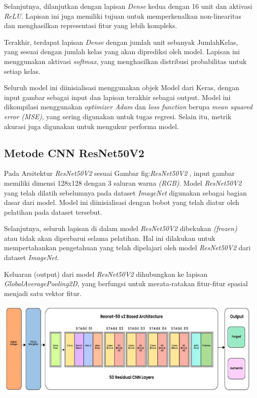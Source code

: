 Selanjutnya, dilanjutkan dengan lapisan \textit{Dense} kedua dengan 16 unit dan aktivasi \textit{ReLU}. Lapisan ini juga memiliki tujuan untuk memperkenalkan non-linearitas dan menghasilkan representasi fitur yang lebih kompleks.

Terakhir, terdapat lapisan \textit{Dense} dengan jumlah unit sebanyak JumlahKelas, yang sesuai dengan jumlah kelas yang akan diprediksi oleh model. Lapisan ini menggunakan aktivasi \textit{softmax}, yang menghasilkan distribusi probabilitas untuk setiap kelas.

Seluruh model ini diinisialisasi menggunakan objek Model dari Keras, dengan input gambar sebagai input dan lapisan terakhir sebagai output. Model ini dikompilasi menggunakan \textit{optimizer Adam} dan \textit{loss function} berupa\textit{ mean squared error (MSE)}, yang sering digunakan untuk tugas regresi. Selain itu, metrik akurasi juga digunakan untuk mengukur performa model.

\subsection{Metode CNN ResNet50V2}

Pada Arsitektur \textit{ResNet50V2} sesuai Gambar {fig:\textit{ResNet50V2}} , input gambar memiliki dimensi 128x128 dengan 3 saluran warna \textit{(RGB)}. Model \textit{ResNet50V2} yang telah dilatih sebelumnya pada dataset \textit{ImageNet} digunakan sebagai bagian dasar dari model. Model ini diinisialisasi dengan bobot yang telah diatur oleh pelatihan pada dataset tersebut.

Selanjutnya, seluruh lapisan di dalam model \textit{ResNet50V2} dibekukan \textit{(frozen)} atau tidak akan diperbarui selama pelatihan. Hal ini dilakukan untuk mempertahankan pengetahuan yang telah dipelajari oleh model \textit{ResNet50V2} dari dataset \textit{ImageNet}.

Keluaran (output) dari model \textit{ResNet50V2} dihubungkan ke lapisan \textit{GlobalAveragePooling2D}, yang berfungsi untuk merata-ratakan fitur-fitur spasial menjadi satu vektor fitur.

\begin{center}
	\includegraphics[width=0.7\linewidth]{gambar/bener/ResNet50v2-architecture.png}
	\label{fig:textitResNet50V2}
\end{center}

